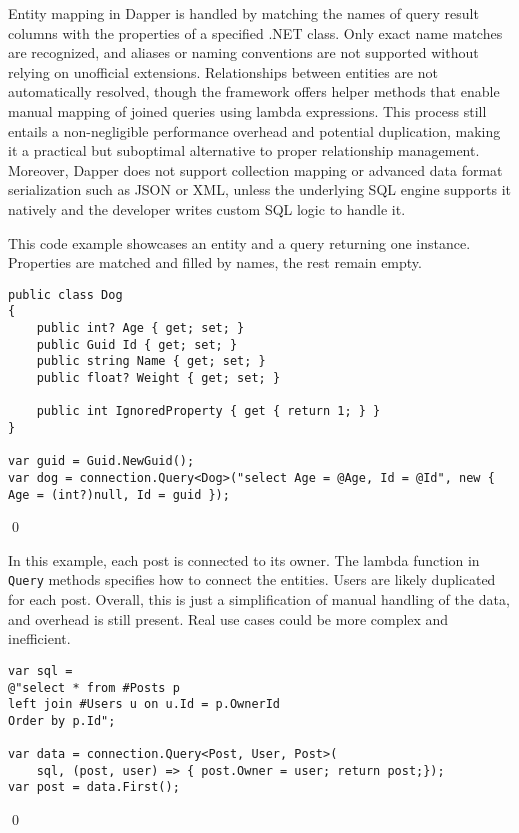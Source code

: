 Entity mapping in Dapper is handled by matching the names of query result columns with the properties of a specified .NET class. Only exact name matches are recognized, and aliases or naming conventions are not supported without relying on unofficial extensions. Relationships between entities are not automatically resolved, though the framework offers helper methods that enable manual mapping of joined queries using lambda expressions. This process still entails a non-negligible performance overhead and potential duplication, making it a practical but suboptimal alternative to proper relationship management. Moreover, Dapper does not support collection mapping or advanced data format serialization such as JSON or XML, unless the underlying SQL engine supports it natively and the developer writes custom SQL logic to handle it.

\begin{example}
\small
This code example\cite{DapperRepo} showcases an entity and a query returning one instance. Properties are matched and filled by names, the rest remain empty.

\begin{lstlisting}[language=CSharp]
public class Dog
{
    public int? Age { get; set; }
    public Guid Id { get; set; }
    public string Name { get; set; }
    public float? Weight { get; set; }

    public int IgnoredProperty { get { return 1; } }
}

var guid = Guid.NewGuid();
var dog = connection.Query<Dog>("select Age = @Age, Id = @Id", new { Age = (int?)null, Id = guid });
\end{lstlisting}
\qed
\end{example}

\begin{example}
\small
In this example, each post is connected to its owner. The lambda function in \texttt{Query} methods specifies how to connect the entities. Users are likely duplicated for each post. Overall, this is just a simplification of manual handling of the data, and overhead is still present. Real use cases could be more complex and inefficient.

\begin{lstlisting}[language=CSharp]
var sql =
@"select * from #Posts p
left join #Users u on u.Id = p.OwnerId
Order by p.Id";

var data = connection.Query<Post, User, Post>(
    sql, (post, user) => { post.Owner = user; return post;});
var post = data.First();
\end{lstlisting}
\qed
\end{example}

